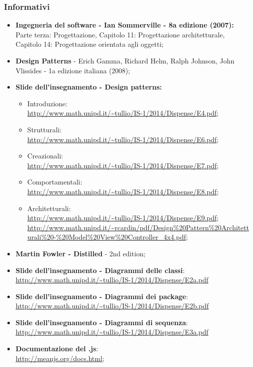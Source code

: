 \subsubsection{Informativi}
\begin{itemize}
\item\textbf{Ingegneria del software - Ian Sommerville - 8a edizione (2007):} \\ Parte terza: Progettazione, Capitolo 11: Progettazione architetturale, Capitolo 14: Progettazione orientata agli oggetti;
\item \textbf{Design Patterns} - Erich Gamma, Richard Helm, Ralph Johnson, John Vlissides - 1a edizione italiana (2008);
\item \textbf{Slide dell'insegnamento - Design patterns:} \\
\begin{itemize}
\item Introduzione: \\
\url{http://www.math.unipd.it/~tullio/IS-1/2014/Dispense/E4.pdf};
\item Strutturali: \\
\url{http://www.math.unipd.it/~tullio/IS-1/2014/Dispense/E6.pdf};
\item Creazionali: \\
\url{http://www.math.unipd.it/~tullio/IS-1/2014/Dispense/E7.pdf};
\item Comportamentali:  \\
\url{http://www.math.unipd.it/~tullio/IS-1/2014/Dispense/E8.pdf};
\item Architetturali: \\
\url{http://www.math.unipd.it/~tullio/IS-1/2014/Dispense/E9.pdf};
\url{http://www.math.unipd.it/~rcardin/pdf/Design%20Pattern%20Architetturali%20-%20Model%20View%20Controller_4x4.pdf};
\end{itemize}
\item \textbf{Martin Fowler -  Distilled} - 2nd edition;
\item\textbf{Slide dell'insegnamento - Diagrammi delle classi}:
\url{http://www.math.unipd.it/~tullio/IS-1/2014/Dispense/E2a.pdf}
\item\textbf{Slide dell'insegnamento - Diagrammi dei package}:
\url{http://www.math.unipd.it/~tullio/IS-1/2014/Dispense/E2b.pdf}
\item\textbf{Slide dell'insegnamento - Diagrammi di sequenza}:
\url{http://www.math.unipd.it/~tullio/IS-1/2014/Dispense/E3a.pdf}
\item \textbf{Documentazione del  .js}: \\ \url{http://meanjs.org/docs.html};

\end{itemize}
